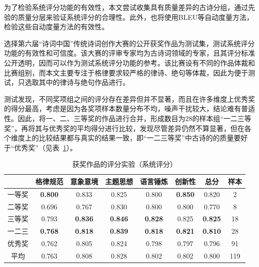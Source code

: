 为了检验系统评分功能的有效性，本文尝试收集具有质量差异的古诗分组，通过先验的质量分层来验证系统评分的合理性。此外，也将使用BLEU等自动度量方法，检验这些自动度量方法的有效性。

选择第六届“诗词中国”传统诗词创作大赛的公开获奖作品为测试集，测试系统评分功能的有效性和可信度。该大赛的评审专家均为古诗词领域的专家，且其评分标准公开透明，因而可以作为测试系统评分功能的参考。该比赛设有不同的作品体裁和比赛组别，而本文主要专注于格律要求较严格的律诗、绝句等体裁，因此为便于测试，只选取其中的律诗与绝句作品进行。%

测试发现，不同奖项组之间的评分存在差异但并不显著，而且在许多维度上优秀奖的得分最高，考虑是因为各奖项样本数量分布不均，噪声干扰较大，结论难有普适性。因此，将一、二、三等奖的作品进行合并，形成数目为28的样本组“一二三等奖”，再将其与优秀奖的平均得分进行比较，发现尽管差异仍然不算显著，但在各个维度上的比较结果都与真实的结果一致，即“一二三等奖”中古诗的的质量要好于“优秀奖”（见表~\ref{tab:test_scoring_prized_dsr1_detail}）。

\begin{table}[ht]
  \centering
  \caption{获奖作品的评分实验（系统评分）}
  \label{tab:test_scoring_prized_dsr1_detail}
  \begin{tabular}{cccccccc}
      \toprule
      &格律规范& 意象意境& 主题思想& 语言锤炼&创新性& 总分&样本\\
      \midrule
      一等奖	&	\textbf{0.800} &	0.833 &	0.825 &	0.800 &	\textbf{0.850} &	0.820 &	2	\\
      二等奖	&	0.696 	&	0.767 	&	0.830 	&	0.800 	&	0.800 	&	0.770 	&	8	\\
      三等奖	&	0.793 	&	\textbf{0.836} 	&	\textbf{0.846} 	&	\textbf{0.828} 	&	0.825 	&	\textbf{0.825} 	&	18	\\
      \cmidrule{2-7} %
      一二三	&	\textbf{0.768} 	&	\textbf{0.818} 	&	\textbf{0.839} 	&	\textbf{0.818} 	&	\textbf{0.821} 	&	\textbf{0.810} 	&	28	\\
      优秀奖	&	0.762 	&	0.805 	&	0.824 	&	0.798 	&	0.797 	&	0.796 	&	91	\\
      \cmidrule{2-7} %
      平均	&	0.763 	&	0.808 	&	0.828 	&	0.802 	&	0.802 	&	0.800 	&	119	\\
      \bottomrule
  \end{tabular}
\end{table}

